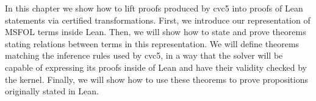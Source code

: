 In this chapter we show how to lift proofs produced by cvc5 into
proofs of Lean statements via certified transformations.
First, we introduce our representation of MSFOL terms inside Lean.
Then, we will show how to state and prove theorems stating relations
between terms in this representation. We will define theorems matching
the inference rules used by cvc5, in a way that the solver will be
capable of expressing its proofs inside of Lean and have their validity
checked by the kernel. Finally, we will show how to use these theorems
to prove propositions originally stated in Lean.




